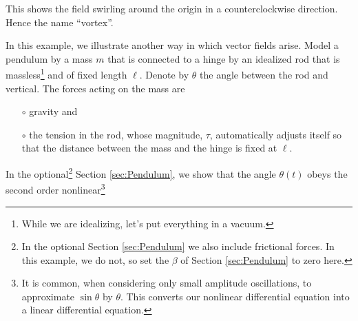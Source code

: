 \begin{eg}
\begin{fig}
\begin{center}
\end{center}
\end{fig}
\noindent
This shows the field swirling around the origin in a counterclockwise direction.
Hence the name ``vortex''.
\end{eg}



\begin{eg}\label{eg:Pendulum}
In this example, we illustrate another way in which  vector fields
arise. Model a pendulum by a mass $m$ that is connected to a hinge by 
an idealized rod that is massless\footnote{While we are idealizing, let's put
everything in a vacuum.} and of fixed length $\ell$. Denote 
by $\theta$ the angle
between the rod and vertical. The forces acting on the mass are
\begin{itemize}\itemsep1pt \parskip0pt  %
\item[$\circ$]
gravity and
\item[$\circ$]
the tension in the rod, whose magnitude, $\tau$, automatically adjusts 
itself so that the distance between the mass and the hinge is 
fixed at $\ell$. 
\end{itemize}
In the optional\footnote{In the optional Section \ref{sec:Pendulum} we also
include frictional forces. In this example, we do not, so set the $\beta$
of Section \ref{sec:Pendulum} to zero here.} Section \ref{sec:Pendulum}, 
we show that the angle $\theta(t)$ obeys the second order 
nonlinear\footnote{It is common, when considering only small amplitude 
oscillations, to approximate $\sin\theta$ by $\theta$. This converts our
nonlinear differential equation into a linear differential equation.} 

\end{eg}
